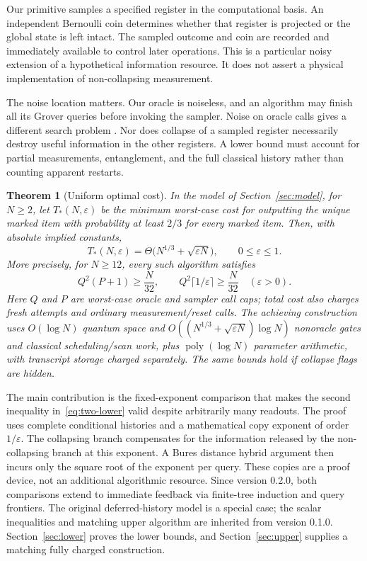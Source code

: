 \documentclass[11pt]{article}
\newtheorem{theorem}{Theorem}
\theoremstyle{remark}
\newcommand{\eps}{\varepsilon}
\begin{document}
Our primitive samples a specified register in the computational basis. An
independent Bernoulli coin determines whether that register is projected or
the global state is left intact. The sampled outcome and coin are recorded
and immediately available to control later operations. This is a particular noisy
extension of a hypothetical information resource. It does not assert a
physical implementation of non-collapsing measurement.

The noise location matters. Our oracle is noiseless, and an algorithm may
finish all its Grover queries before invoking the sampler. Noise on oracle
calls gives a different search problem \cite{rs,rosmanis}. Nor does collapse
of a sampled register necessarily destroy useful information in the other
registers. A lower bound must account for partial measurements, entanglement,
and the full classical history rather than counting apparent restarts.

\begin{theorem}[Uniform optimal cost]\label{thm:main}
In the model of Section~\ref{sec:model}, for $N\ge2$, let $T_*(N,\eps)$ be the minimum
worst-case cost for outputting the unique marked item with probability at
least $2/3$ for every marked item. Then, with absolute implied constants,
\begin{equation}\label{eq:main}
 T_*(N,\eps)=\Theta\bigl(N^{1/3}+\sqrt{\eps N}\bigr),
 \qquad 0\le\eps\le1.
\end{equation}
More precisely, for $N\ge12$, every such algorithm satisfies
\begin{equation}\label{eq:two-lower}
 Q^2(P+1)\ge\frac N{32},\qquad
 Q^2\lceil1/\eps\rceil\ge\frac N{32}\quad(\eps>0).
\end{equation}
Here $Q$ and $P$ are worst-case oracle and sampler call caps; total cost also
charges fresh attempts and ordinary measurement/reset calls. The achieving
construction uses $O(\log N)$ quantum space and
$O((N^{1/3}+\sqrt{\eps N})\log N)$ nonoracle gates and classical scheduling/scan
work, plus $\operatorname{poly}(\log N)$ parameter arithmetic,
with transcript storage charged separately. The same bounds hold if collapse
flags are hidden.
\end{theorem}

The main contribution is the fixed-exponent comparison that makes the second
inequality in~\eqref{eq:two-lower} valid despite arbitrarily many readouts.
The proof uses complete conditional histories and a mathematical copy
exponent of order $1/\eps$. The collapsing branch compensates for the
information released by the non-collapsing branch at this exponent. A Bures
distance hybrid argument then incurs only the square root of the exponent
per query. These copies are a proof device, not an additional algorithmic
resource. Since version 0.2.0, both comparisons extend to immediate feedback via
finite-tree induction and query frontiers. The original deferred-history
model is a special case; the scalar inequalities and matching upper algorithm
are inherited from version 0.1.0.
Section~\ref{sec:lower} proves the lower bounds, and
Section~\ref{sec:upper} supplies a matching fully charged construction.
\end{document}
